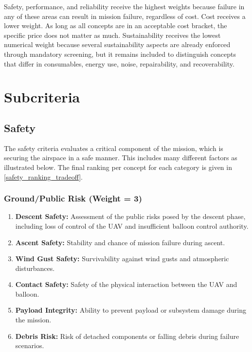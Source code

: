 Safety, performance, and reliability receive the highest weights because failure in any of these areas can result in mission failure, regardless of cost. Cost receives a lower weight. As long as all concepts are in an acceptable cost bracket, the specific price does not matter as much. Sustainability receives the lowest numerical weight because several sustainability aspects are already enforced through mandatory screening, but it remains included to distinguish concepts that differ in consumables, energy use, noise, repairability, and recoverability.






\section{Subcriteria}

\subsection{Safety}

The safety criteria evaluates a critical component of the mission, which is securing the airspace in a safe manner. This includes many different factors as illustrated below. The final ranking per concept for each category is given in \autoref{safety_ranking_tradeoff}.

\subsubsection*{Ground/Public Risk (Weight = 3)}
\begin{enumerate}
    \item \textbf{Descent Safety:} Assessment of the public risks posed by the descent phase, including loss of control of the UAV and insufficient balloon control authority.
    \item \textbf{Ascent Safety:} Stability and chance of mission failure during ascent.
    \item \textbf{Wind Gust Safety:} Survivability against wind gusts and atmospheric disturbances.
    \item \textbf{Contact Safety:} Safety of the physical interaction between the UAV and balloon.
    \item \textbf{Payload Integrity:} Ability to prevent payload or subsystem damage during the mission.
    \item \textbf{Debris Risk:} Risk of detached components or falling debris during failure scenarios.
\end{enumerate}

